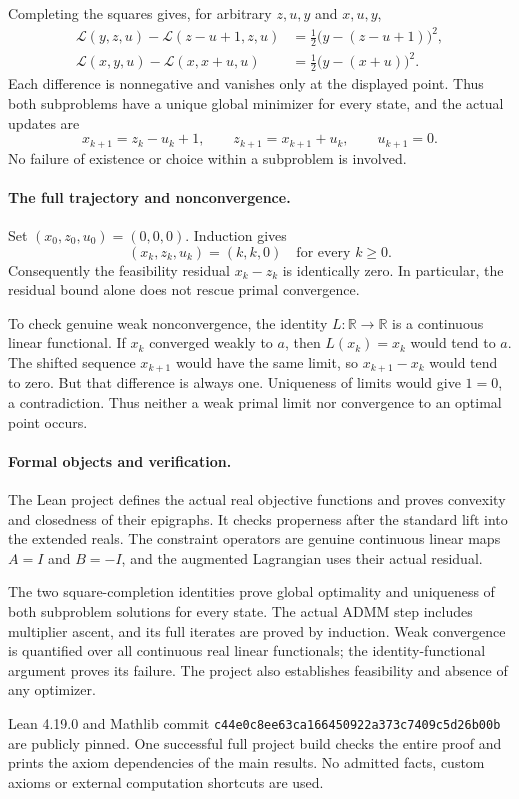 \documentclass[11pt]{article}
\begin{document}
\newpage
Completing the squares gives, for arbitrary $z,u,y$ and $x,u,y$,
\begin{align*}
\mathcal L(y,z,u)-\mathcal L(z-u+1,z,u)
 &=\tfrac12\bigl(y-(z-u+1)\bigr)^2,\\
\mathcal L(x,y,u)-\mathcal L(x,x+u,u)
 &=\tfrac12\bigl(y-(x+u)\bigr)^2.
\end{align*}
Each difference is nonnegative and vanishes only at the displayed point. Thus both subproblems have a unique global minimizer for every state, and the actual updates are
\[
x_{k+1}=z_k-u_k+1,\qquad z_{k+1}=x_{k+1}+u_k,\qquad u_{k+1}=0.
\]
No failure of existence or choice within a subproblem is involved.

\paragraph{The full trajectory and nonconvergence.}
Set $(x_0,z_0,u_0)=(0,0,0)$. Induction gives
\[
(x_k,z_k,u_k)=(k,k,0)\quad\text{for every }k\ge0.
\]
Consequently the feasibility residual $x_k-z_k$ is identically zero. In particular, the residual bound alone does not rescue primal convergence.

To check genuine weak nonconvergence, the identity $L:\mathbb R\to\mathbb R$ is a continuous linear functional. If $x_k$ converged weakly to $a$, then $L(x_k)=x_k$ would tend to $a$. The shifted sequence $x_{k+1}$ would have the same limit, so $x_{k+1}-x_k$ would tend to zero. But that difference is always one. Uniqueness of limits would give $1=0$, a contradiction. Thus neither a weak primal limit nor convergence to an optimal point occurs.

\paragraph{Formal objects and verification.}
The Lean project defines the actual real objective functions and proves convexity and closedness of their epigraphs. It checks properness after the standard lift into the extended reals. The constraint operators are genuine continuous linear maps $A=I$ and $B=-I$, and the augmented Lagrangian uses their actual residual.

The two square-completion identities prove global optimality and uniqueness of both subproblem solutions for every state. The actual ADMM step includes multiplier ascent, and its full iterates are proved by induction. Weak convergence is quantified over all continuous real linear functionals; the identity-functional argument proves its failure. The project also establishes feasibility and absence of any optimizer.

Lean 4.19.0 and Mathlib commit \texttt{c44e0c8ee63ca166450922a373c7409c5d26b00b} are publicly pinned. One successful full project build checks the entire proof and prints the axiom dependencies of the main results. No admitted facts, custom axioms or external computation shortcuts are used.
\end{document}
